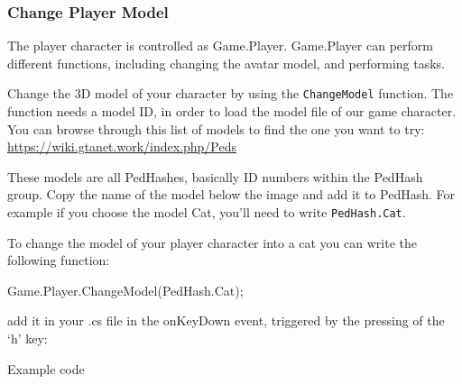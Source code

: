 \documentclass[
  openany]{book}
\newenvironment{Shaded}{\begin{snugshade}}{\end{snugshade}}
\newcommand{\FunctionTok}[1]{\textcolor[rgb]{0.00,0.00,0.00}{#1}}
\newcommand{\NormalTok}[1]{#1}
\begin{document}
\hypertarget{change-player-model}{%
\subsubsection*{Change Player Model}\label{change-player-model}}

The player character is controlled as Game.Player. Game.Player can perform different functions, including changing the avatar model, and performing tasks.

Change the 3D model of your character by using the \texttt{ChangeModel} function.
The function needs a model ID, in order to load the model file of our game character.
You can browse through this list of models to find the one you want to try: \url{https://wiki.gtanet.work/index.php/Peds}

These models are all PedHashes, basically ID numbers within the PedHash group. Copy the name of the model below the image and add it to PedHash.
For example if you choose the model Cat, you'll need to write \texttt{PedHash.Cat}.

To change the model of your player character into a cat you can write the following function:

\begin{Shaded}
\begin{Highlighting}[]
\NormalTok{Game.}\FunctionTok{Player}\NormalTok{.}\FunctionTok{ChangeModel}\NormalTok{(PedHash.}\FunctionTok{Cat}\NormalTok{);}
\end{Highlighting}
\end{Shaded}

add it in your .cs file in the onKeyDown event, triggered by the pressing of the `h' key:

Example code
\end{document}
